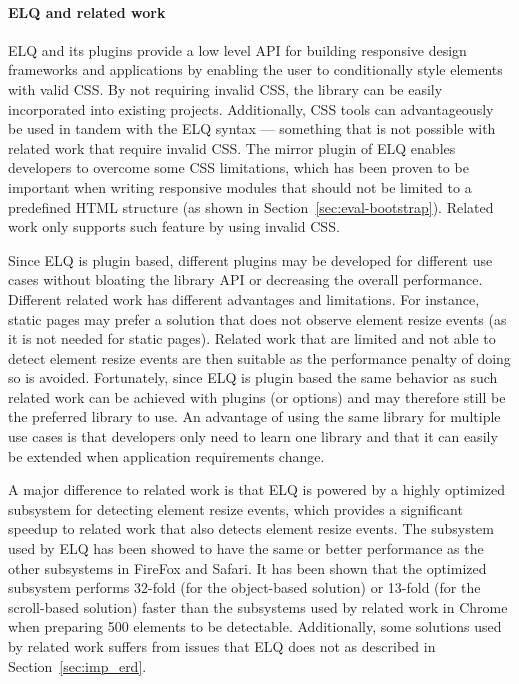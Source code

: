 \documentclass[a4paper,11pt]{kth-mag}
\begin{document}

    \paragraph{ELQ and related work}
    \gls{ELQ} and its plugins provide a low level \gls{API} for building \gls{responsive} design frameworks and applications by enabling the user to conditionally style \glspl{element} with valid \gls{CSS}.
    By not requiring invalid \gls{CSS}, the library can be easily incorporated into existing projects.
    Additionally, \gls{CSS} tools can advantageously be used in tandem with the \gls{ELQ} syntax --- something that is not possible with related work that require invalid \gls{CSS}.
    The mirror plugin of \gls{ELQ} enables developers to overcome some \gls{CSS} limitations, which has been proven to be important when writing \gls{responsive} modules that should not be limited to a predefined \gls{HTML} structure (as shown in Section~\ref{sec:eval-bootstrap}).
    Related work only supports such feature by using invalid \gls{CSS}.

    Since \gls{ELQ} is plugin based, different plugins may be developed for different use cases without bloating the library \gls{API} or decreasing the overall performance.
    Different related work has different advantages and limitations.
    For instance, static pages may prefer a solution that does not observe \gls{element} resize events (as it is not needed for static pages).
    Related work that are limited and not able to detect element resize events are then suitable as the performance penalty of doing so is avoided.
    Fortunately, since \gls{ELQ} is plugin based the same behavior as such related work can be achieved with plugins (or options) and may therefore still be the preferred library to use.
    An advantage of using the same library for multiple use cases is that developers only need to learn one library and that it can easily be extended when application requirements change.

    A major difference to related work is that \gls{ELQ} is powered by a highly optimized subsystem for detecting \gls{element} resize events, which provides a significant speedup to related work that also detects \gls{element} resize events.
    The subsystem used by \gls{ELQ} has been showed to have the same or better performance as the other subsystems in FireFox and Safari.
    It has been shown that the optimized subsystem performs 32-fold (for the object-based solution) or 13-fold (for the scroll-based solution) faster than the subsystems used by related work in Chrome when preparing 500 \glspl{element} to be detectable.
    Additionally, some solutions used by related work suffers from issues that \gls{ELQ} does not as described in Section~\ref{sec:imp_erd}.
\end{document}
